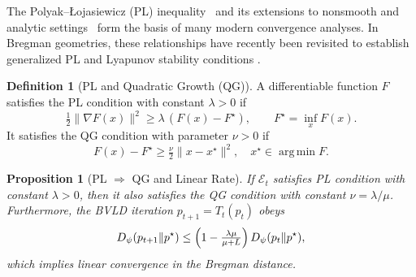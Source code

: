 \documentclass[11pt]{article}
\newcommand{\Ecal}{\mathcal{E}}
\DeclareMathOperator*{\argmin}{arg\,min}
\theoremstyle{plain}
\newtheorem{proposition}[theorem]{Proposition}
\theoremstyle{definition}
\newtheorem{definition}[theorem]{Definition}
\theoremstyle{remark}
\begin{document}
The Polyak--Łojasiewicz (PL) inequality~\cite{Polyak1963}
and its extensions to nonsmooth and analytic settings~\cite{Lojasiewicz1963,Bolte2007,Karimi2016}
form the basis of many modern convergence analyses.
In Bregman geometries, these relationships have recently been revisited
to establish generalized PL and Lyapunov stability conditions
\cite{Attouch2013,Bolte2014,Zhang2020,Li2022,HassanMoghaddam2023}.

\begin{definition}[PL and Quadratic Growth (QG)]
\label{def:pl-qg}
A differentiable function $F$ satisfies the PL condition with constant 
$\lambda>0$ if
\begin{equation}
\tfrac12\|\nabla F(x)\|^2\ge\lambda\,(F(x)-F^\star),
\qquad F^\star=\inf_x F(x).
\label{eq:pl}
\end{equation}
It satisfies the QG condition with parameter $\nu>0$ if
\begin{equation}
F(x)-F^\star\ge\tfrac{\nu}{2}\|x-x^\star\|^2,
\quad x^\star\in\argmin F.
\label{eq:qg}
\end{equation}
\end{definition}

\begin{proposition}[PL $\Rightarrow$ QG and Linear Rate]
\label{prop:pl-qg}
If $\Ecal_t$ satisfies PL condition with constant $\lambda>0$, 
then it also satisfies the QG condition with constant $\nu=\lambda/\mu$. 
Furthermore, the BVLD iteration $p_{t+1}=T_t(p_t)$ obeys
\begin{equation}
D_\psi(p_{t+1}\|p^\star)
\le \Bigl(1-\tfrac{\lambda\mu}{\mu+L}\Bigr)\,D_\psi(p_t\|p^\star),
\label{eq:linear-rate}
\end{equation}
which implies linear convergence in the Bregman distance.
\end{proposition}
\end{document}
